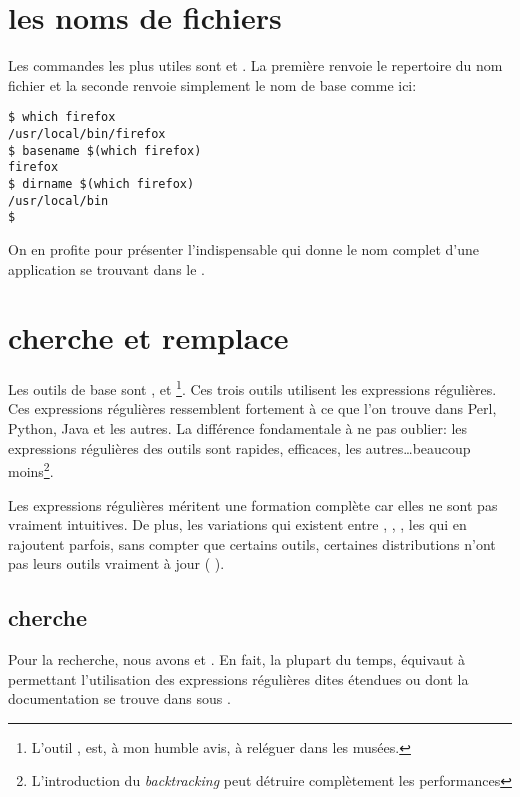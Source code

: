 
\section{les noms de fichiers}

Les commandes les plus utiles sont  et . La première renvoie le repertoire du nom fichier et la seconde renvoie simplement le nom de base comme ici:

\begin{lstlisting}
$ which firefox 
/usr/local/bin/firefox
$ basename $(which firefox)
firefox
$ dirname $(which firefox) 
/usr/local/bin
$
\end{lstlisting}

On en profite pour présenter l'indispensable  qui donne le nom complet d'une application se trouvant dans le .

\section{cherche et remplace}
Les outils de base sont ,  et \footnote{L'outil , est, à mon humble avis, à reléguer dans les musées.}. Ces trois outils utilisent les expressions régulières. Ces expressions régulières ressemblent fortement à ce que l'on trouve dans Perl, Python, Java et les autres. La différence fondamentale à ne pas oublier: les expressions régulières des outils \GNU{} sont rapides, efficaces, les autres\ldots beaucoup moins\footnote{L'introduction du \emph{backtracking} peut détruire complètement les performances}.

Les expressions régulières méritent une formation complète car elles ne sont pas vraiment intuitives. De plus, les variations qui existent entre \POSIX, \GNU, \BSD, les \shells{} qui en rajoutent parfois, sans compter que certains outils, certaines distributions n'ont pas leurs outils vraiment à jour (\cf{} \RedHat{}).

\subsection{cherche}
Pour la recherche, nous avons  et . En fait, la plupart du temps,  équivaut à  permettant l'utilisation des expressions régulières dites étendues ou \POSIX{} dont la documentation se trouve dans  sous \Debian.
